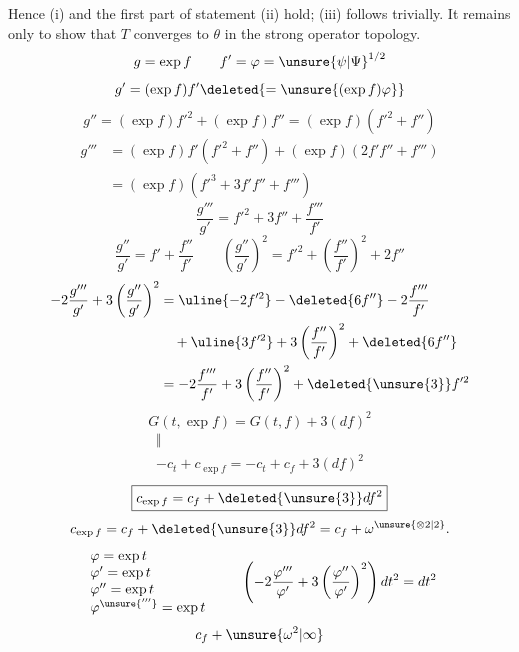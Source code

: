 Hence (i) and the first part of statement (ii) hold; (iii) follows trivially. It remains only to show that $T$ converges to $\theta$ in the strong operator topology.
\[
g=\exp f\qquad f'=\varphi=\unsure{\psi|\Psi}^{1/2}
\]
\[
g'=(\exp f)f'\deleted{=\unsure{(\exp f)\varphi}}
\]
\[
g''=(\exp f)f'^2+(\exp f)f''=(\exp f)(f'^2+f'')
\]
\[
\begin{aligned}
g'''&=(\exp f)f'(f'^2+f'')+(\exp f)(2f'f''+f''')\\
&=(\exp f)(f'^3+3f'f''+f''')
\end{aligned}
\]
\[
\frac{g'''}{g'}=f'^2+3f''+\frac{f'''}{f'}
\]
\[
\frac{g''}{g'}=f'+\frac{f''}{f'}\qquad
\left(\frac{g''}{g'}\right)^2=f'^2+\left(\frac{f''}{f'}\right)^2+2f''
\]
\[
\begin{aligned}
-2\frac{g'''}{g'}+3\left(\frac{g''}{g'}\right)^2
&=\uline{-2f'^2}-\deleted{6f''}-2\frac{f'''}{f'}\\
&\quad+\uline{3f'^2}+3\left(\frac{f''}{f'}\right)^2+\deleted{6f''}\\
&=-2\frac{f'''}{f'}+3\left(\frac{f''}{f'}\right)^2+\deleted{\unsure{3}}f'^2
\end{aligned}
\]
\[
G(t,\exp f)=G(t,f)+3(df)^2
\]
\[
\begin{array}{c}
\Vert\\
-c_t+c_{\exp f}=-c_t+c_f+3(df)^2
\end{array}
\]
\[
\boxed{c_{\exp f}=c_f+\deleted{\unsure{3}}df^2}
\]
\[
c_{\exp f}=c_f+\deleted{\unsure{3}}df^2=c_f+\omega^{\unsure{\otimes2|2}}.
\]
\[
\begin{array}{l}
\varphi=\exp t\\
\varphi'=\exp t\\
\varphi''=\exp t\\
\varphi^{\unsure{'''}}=\exp t
\end{array}
\qquad
\left(-2\frac{\varphi'''}{\varphi'}+3\left(\frac{\varphi''}{\varphi'}\right)^2\right)dt^2=dt^2
\]
\[
c_f+\unsure{\omega^2|\infty}
\]



